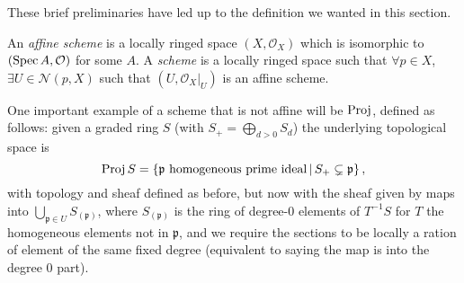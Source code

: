 \documentclass[000-main.tex]{subfiles}
\begin{document}
These brief preliminaries have led up to the definition we wanted in this section.

\begin{definition}
  An \emph{affine scheme} is a locally ringed space $(X, \mathcal{O}_X)$ which is isomorphic to $(\operatorname{Spec} A, \mathcal{O})$ for some $A$.
  A \emph{scheme} is a locally ringed space such that $\forall p \in X$, $\exists U \in \mathcal{N}(p, X)$ such that $(U, \left . \mathcal{O}_X \right \rvert_{U})$ is an affine scheme.
\end{definition}

\begin{example}
\end{example}

One important example of a scheme that is not affine will be $\operatorname{Proj}$, defined as follows: given a graded ring $S$ (with $S_+ = \bigoplus_{d > 0 } S_d$) the underlying topological space is
\[
  \operatorname{Proj} S = \left \lbrace \mathfrak{p} \text{ homogeneous prime ideal} \, | \, S_+ \subsetneq \mathfrak{p} \right \rbrace ,
\]
with topology and sheaf defined as before, but now with the sheaf given by maps into $\bigcup_{\mathfrak{p} \in U} S_{(\mathfrak{p})}$, where $S_{(\mathfrak{p})}$ is the ring of degree-0 elements of $T^{-1}S$ for $T$ the homogeneous elements not in $\mathfrak{p}$, and we require the sections to be locally a ration of element of the same fixed degree (equivalent to saying the map is into the degree 0 part).

\end{document}
